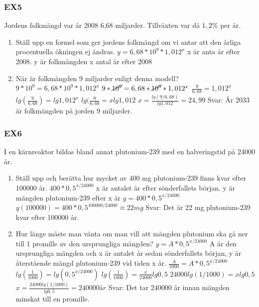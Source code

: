 \documentclass[a4paper,11pt]{article}
\begin{document}
\begin{flushleft}
\subsubsection{EX5}
Jordens folkmängd var år 2008 6,68 miljarder. Tillväxten var då $ 1,2\% $ per år.
\begin{enumerate}
  \item Ställ upp en formel som ger jordens folkmängd om vi antar att den årliga procentuella ökningen ej ändras.\newline
  $ y=6,68*10^9*1,012^x $\newline
  x är anta år efter 2008. y är folkmängden x antal år efter 2008
  \item När är folkmängden 9 miljarder enligt denna modell?\newline
  $ 9*10^9 = 6,68*10^9*1,012^x $\newline
  $ 9*\cancel{10^9} = 6,68*\cancel{10^9}*1,012^x $\newline
  $ \frac{9}{6,68} = 1,012^x $\newline
  $ lg(\frac{9}{6,68}) = lg1,012^x $\newline
  $ lg(\frac{9}{6,68} = xlg1,012 $\newline
  $ x = \frac{lg(9/6,68)}{lg1,012} = 24,99 $\newline
  Svar: År 2033 är folkmängden på jorden 9 miljarder.
  \end{enumerate}
  \subsubsection{EX6}
  I en kärnreaktor bildas bland annat plutonium-239 med en halveringstid på 24000 år.
  \begin{enumerate}
    \item Ställ upp och berätta hur mycket av 400 mg plutonium-239 finns kvar efter 100000 år.\newline
    $ 400*0,5^{x/24000} $\newline
    x är antalet år efter sönderfallets början. y är mängden plutonium-239 efter x är
    $ y = 400*0,5^{x/24000} $\newline
    $ y(100000) = 400*0,5^{100000/24000}\approx22mg $
    Svar: Det är 22 mg plutonium-239 kvar efter 100000 år.
    \item Hur länge måste man vänta om man vill att mängden plutonium ska gå ner till 1 promille av den ursprungliga mängden?\newline
    $ y = A*0,5^{x/24000} $\newline
    A är den ursprungliga mängden och x är antalet år sedan sönderfallets början, y är återstående mängd plutonium-239 vid tiden x år.
    $ \frac{A}{1000} = A*0,5^{x/24000} $\newline
    $ lg(\frac{1}{1000}) = lg(0,5^{x/24000}) $\newline
    $ lg(\frac{1}{1000}) = \frac{x}{24000}lg0,5 $\newline
    $ 24000lg(1/1000) = xlg0,5 $\newline
    $ x = \frac{24000lg(1/1000)}{lg0,5} = 240000år $\newline
    Svar: Det tar 240000 år innan mängden minskat till en promille.
  \end{enumerate}
  \newpage

\end{flushleft}
\end{document}
